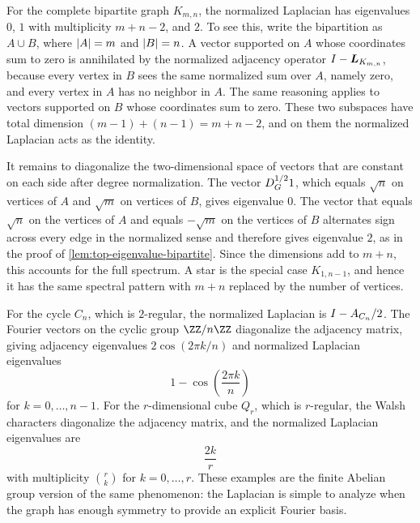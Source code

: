 \begin{example}
	\label{ex:laplacian-complete-bipartite}
	For the complete bipartite graph \(K_{m,n}\), the normalized Laplacian has eigenvalues \(0\), \(1\) with multiplicity \(m+n-2\), and \(2\). To see this, write the bipartition as \(A\cup B\), where \(\lvert A\rvert=m\) and \(\lvert B\rvert=n\). A vector supported on \(A\) whose coordinates sum to zero is annihilated by the normalized adjacency operator \(I-\boldsymbol{L}_{K_{m,n}}\), because every vertex in \(B\) sees the same normalized sum over \(A\), namely zero, and every vertex in \(A\) has no neighbor in \(A\). The same reasoning applies to vectors supported on \(B\) whose coordinates sum to zero. These two subspaces have total dimension \((m-1)+(n-1)=m+n-2\), and on them the normalized Laplacian acts as the identity.

	It remains to diagonalize the two-dimensional space of vectors that are constant on each side after degree normalization. The vector \(D_{G}^{1/2}1\), which equals \(\sqrt{n}\) on vertices of \(A\) and \(\sqrt{m}\) on vertices of \(B\), gives eigenvalue \(0\). The vector that equals \(\sqrt{n}\) on the vertices of \(A\) and equals \(-\sqrt{m}\) on the vertices of \(B\) alternates sign across every edge in the normalized sense and therefore gives eigenvalue \(2\), as in the proof of \cref{lem:top-eigenvalue-bipartite}. Since the dimensions add to \(m+n\), this accounts for the full spectrum. A star is the special case \(K_{1,n-1}\), and hence it has the same spectral pattern with \(m+n\) replaced by the number of vertices.
\end{example}

\begin{example}
	\label{ex:laplacian-cycles-cubes}
	For the cycle \(C_n\), which is \(2\)-regular, the normalized Laplacian is \(I-A_{C_n}/2\). The Fourier vectors on the cyclic group \(\ZZ/n\ZZ\) diagonalize the adjacency matrix, giving adjacency eigenvalues \(2\cos(2\pi k/n)\) and normalized Laplacian eigenvalues
	\begin{equation}
		1-\cos\left(\frac{2\pi k}{n}\right)
	\end{equation}
	for \(k=0,\ldots,n-1\). For the \(r\)-dimensional cube \(Q_r\), which is \(r\)-regular, the Walsh characters diagonalize the adjacency matrix, and the normalized Laplacian eigenvalues are
	\begin{equation}
		\frac{2k}{r}
	\end{equation}
	with multiplicity \(\binom{r}{k}\) for \(k=0,\ldots,r\). These examples are the finite Abelian group version of the same phenomenon: the Laplacian is simple to analyze when the graph has enough symmetry to provide an explicit Fourier basis.
\end{example}

